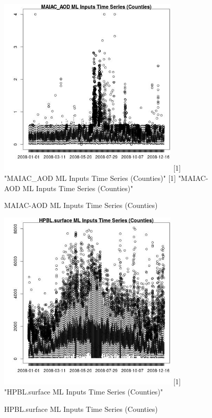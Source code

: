 \begin{figure} 
\centering  
\includegraphics[width=0.77\textwidth]{Code_Outputs/ML_input_report_ML_input_CountyGeometricCentroids_Locations_Dates_part_c_2008-01-01to2008-12-31_MAIAC_AODTS.jpg} 
[1] "MAIAC_AOD ML Inputs Time Series (Counties)"
[1] "MAIAC-AOD ML Inputs Time Series (Counties)"
\caption{\label{fig:ML_input_report_ML_input_CountyGeometricCentroids_Locations_Dates_part_c_2008-01-01to2008-12-31MAIAC_AODTS}MAIAC-AOD ML Inputs Time Series (Counties)} 
\end{figure} 
 

\begin{figure} 
\centering  
\includegraphics[width=0.77\textwidth]{Code_Outputs/ML_input_report_ML_input_CountyGeometricCentroids_Locations_Dates_part_c_2008-01-01to2008-12-31_HPBL.surfaceTS.jpg} 
[1] "HPBL.surface ML Inputs Time Series (Counties)"
\caption{\label{fig:ML_input_report_ML_input_CountyGeometricCentroids_Locations_Dates_part_c_2008-01-01to2008-12-31HPBL.surfaceTS}HPBL.surface ML Inputs Time Series (Counties)} 
\end{figure} 
 

